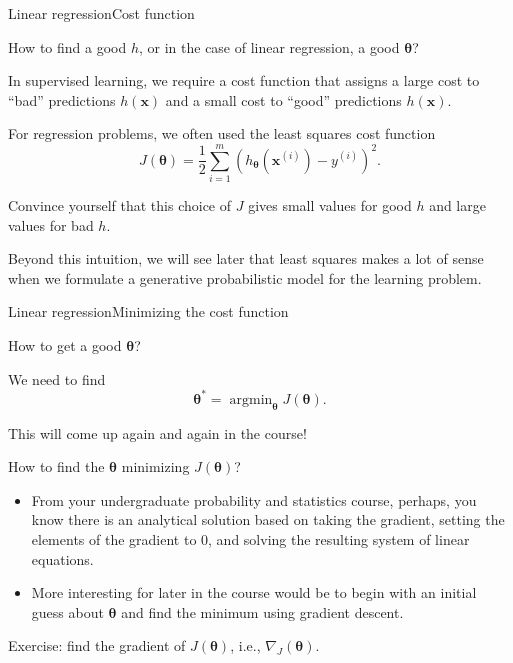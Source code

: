 \documentclass{beamer}
\renewcommand{\vec}[1]{\boldsymbol{#1}}
\DeclareMathOperator*{\argmin}{argmin}
\begin{document}
\begin{frame}{Linear regression}{Cost function}

  How to find a good $h$, or in the case of linear regression, a good
  $\vec{\theta}$?

  \medskip

  In supervised learning, we require a \alert{cost function} that assigns
  a large cost to ``bad'' predictions $h(\vec{x})$ and a small
  cost to ``good'' predictions $h(\vec{x})$.

  \medskip

  For regression problems, we often used the \alert{least squares}
  cost function
  \[ J(\vec{\theta}) =
  \frac{1}{2}\sum_{i=1}^m (h_{\vec{\theta}}(\vec{x}^{(i)}) - y^{(i)})^2 .\] 

  \medskip

  Convince yourself that this choice of $J$ gives small values for
  good $h$ and large values for bad $h$.

  \medskip

  Beyond this intuition, we will see later that least squares makes a
  lot of sense when we formulate a \alert{generative probabilistic
    model} for the learning problem.
  
\end{frame}

\begin{frame}{Linear regression}{Minimizing the cost function}

  How to get a good $\vec{\theta}$?

  \medskip

  We need to find \[ \vec{\theta}^* = \argmin_{\vec{\theta}} J(\vec{\theta}) .\]

  \medskip

  This will come up again and again in the course!

  \medskip

  How to find the $\vec{\theta}$ minimizing $J(\vec{\theta})$?
  \begin{itemize}
  \item From your undergraduate probability and statistics course,
    perhaps, you know there is an analytical solution based on taking
    the gradient, setting the elements of the gradient to 0, and
    solving the resulting system of linear equations.
  \item More interesting for later in the course would be to begin
    with an initial guess about $\vec{\theta}$ and find the minimum
    using \alert{gradient descent}.
  \end{itemize}

  \medskip

  Exercise: find the gradient of $J(\vec{\theta})$, i.e.,
  $\nabla_J(\vec{\theta})$.
  
\end{frame}
\end{document}
